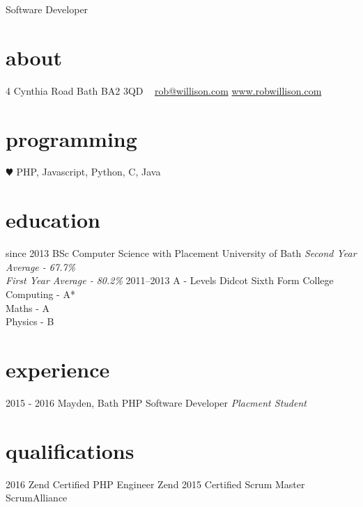 \documentclass[]{friggeri-cv}
\begin{document}
       {Software Developer}


\begin{aside}
  \section{about}
    4 Cynthia Road
    Bath
    BA2 3QD
    ~
    \href{mailto:rob@willison.com}{rob@willison.com}
    \href{http://www.robwillison.com}{www.robwillison.com}
  \section{programming}
    {\color{red} $\varheartsuit$} PHP,
    Javascript,
    Python, C, Java
\end{aside}

\section{education}

\begin{entrylist}
  \entry
    {since 2013}
    {BSc {\normalfont Computer Science with Placement}}
    {University of Bath}
    {\emph{Second Year Average - 67.7\% \\ First Year Average - 80.2\%}}
  \entry
    {2011–2013}
    {A - Levels}
    {Didcot Sixth Form College}
    {Computing - A* \\ Maths - A \\ Physics - B}
\end{entrylist}

\section{experience}

\begin{entrylist}
  \entry
    {2015 - 2016}
    {Mayden, Bath}
    {PHP Software Developer}
    {\emph{Placment Student}}
\end{entrylist}

\section{qualifications}

\begin{entrylist}
  \entry
    {2016}
    {Zend Certified PHP Engineer}
    {Zend}
    {}
  \entry
    {2015}
    {Certified Scrum Master}
    {ScrumAlliance}
    {}
\end{entrylist}
\end{document}
